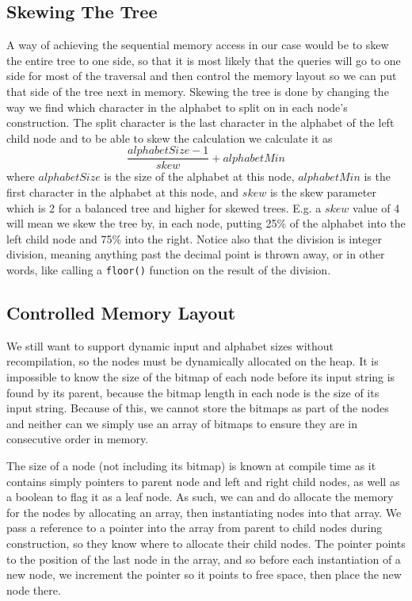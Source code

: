 \subsection{Skewing The Tree}
A way of achieving the sequential memory access in our case would be to skew the entire tree to one side, so that it is most likely that the queries will go to one side for most of the traversal and then control the memory layout so we can put that side of the tree next in memory.
Skewing the tree is done by changing the way we find which character in the alphabet to split on in each node's construction.
The split character is the last character in the alphabet of the left child node and to be able to skew the calculation we calculate it as
\[ \frac{alphabetSize-1}{skew} + alphabetMin \]
where $alphabetSize$ is the size of the alphabet at this node, $alphabetMin$ is the first character in the alphabet at this node, and $skew$ is the skew parameter which is 2 for a balanced tree and higher for skewed trees. E.g. a $skew$ value of 4 will mean we skew the tree by, in each node, putting 25\% of the alphabet into the left child node and 75\% into the right.
Notice also that the division is integer division, meaning anything past the decimal point is thrown away, or in other words, like calling a \texttt{floor()} function on the result of the division.

\subsection{Controlled Memory Layout}
We still want to support dynamic input and alphabet sizes without recompilation, so the nodes must be dynamically allocated on the heap.
It is impossible to know the size of the bitmap of each node before its input string is found by its parent, because the bitmap length in each node is the size of its input string.
Because of this, we cannot store the bitmaps as part of the nodes and neither can we simply use an array of bitmaps to ensure they are in consecutive order in memory.

The size of a node (not including its bitmap) is known at compile time as it contains simply pointers to parent node and left and right child nodes, as well as a boolean to flag it as a leaf node.
As such, we can and do allocate the memory for the nodes by allocating an array, then instantiating nodes into that array.
We pass a reference to a pointer into the array from parent to child nodes during construction, so they know where to allocate their child nodes.
The pointer points to the position of the last node in the array, and so before each instantiation of a new node, we increment the pointer so it points to free space, then place the new node there.

